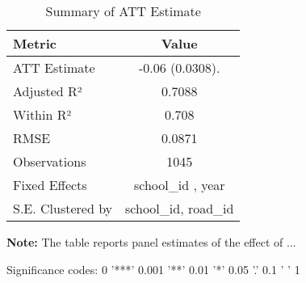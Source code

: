 \begin{table}[H]
\centering
\caption{Summary of ATT Estimate}
\label{tab:SA_hca_10p}
 \begin{center}
 \begin{tabular}{lc}
 \toprule
Metric & Value \\
\midrule
ATT Estimate & -0.06 (0.0308). \\
\hline 
 Adjusted R² & 0.7088 \\
Within R² & 0.708 \\
RMSE & 0.0871 \\
Observations & 1045 \\
\hline 
 Fixed Effects & school_id ,  year \\
S.E. Clustered by & school_id, road_id \\
\bottomrule
\end{tabular}
 \end{center}\begin{tablenotes}
\small
\item \textbf{Note:} The table reports panel estimates of the effect of ...
\item Significance codes: 0 '***' 0.001 '**' 0.01 '*' 0.05 '.' 0.1 ' ' 1
\end{tablenotes}
\end{table}